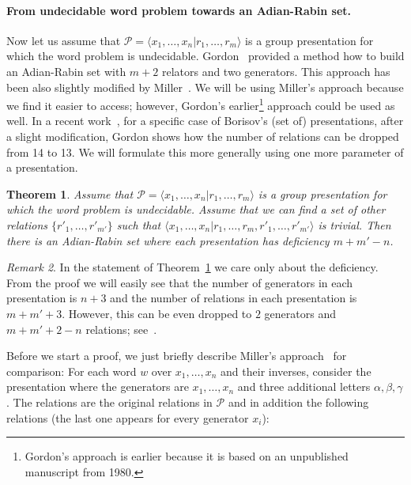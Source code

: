 \documentclass[10pt,a4paper]{article}
\newtheorem{theorem}{Theorem}
\theoremstyle{definition}
\theoremstyle{remark}
\newtheorem{remark}[theorem]{Remark}
\newcommand\PP{\mathcal{P}}
\begin{document}
\paragraph{From undecidable word problem towards an Adian-Rabin set.} Now let us assume that
$\PP = \langle x_1, \dots, x_n|r_1, \dots, r_m\rangle$ is a group presentation
for which the word problem is undecidable. Gordon~\cite{gordon95} provided a
method how to build an Adian-Rabin set with $m+2$ relators and two
generators. This approach has been also slightly modified by
Miller~\cite{miller92}. We will be using Miller's approach because we find it
easier to access; however, Gordon's earlier\footnote{Gordon's approach is
earlier because it is based on an unpublished manuscript from 1980.} approach
could be used as well. In a recent work~\cite{gordon21}, for a specific case of
Borisov's (set of) presentations, after a slight modification, Gordon shows how the number of
relations can be dropped from 14 to 13. We will formulate this more generally
using one more parameter of a presentation.

\begin{theorem}
\label{t:ar_sequence}
Assume that $\PP = \langle x_1, \dots, x_n|r_1, \dots, r_m\rangle$ is a group
  presentation for which the word problem is undecidable. Assume that we can
  find a set of other relations $\{r'_1, \dots, r'_{m'}\}$ such that
  $\langle x_1, \dots, x_n|r_1, \dots, r_m, r'_1, \dots, r'_{m'}\rangle$ is
  trivial. Then there is an Adian-Rabin set where each presentation has
  deficiency $m + m' - n$.
\end{theorem}


\begin{remark}
  In the statement of Theorem~\ref{t:ar_sequence} we care only about the
  deficiency. From the proof we will easily see that the number of
  generators in each presentation is $n+3$ and the number of relations in each
  presentation is $m + m' + 3$. However, this can be even dropped to $2$ generators and
  $m + m' + 2 - n$ relations; see~\cite{miller92,chernavsky-leksine06}.
\end{remark}

Before we start a proof, we just briefly describe Miller's
approach~\cite{miller92} for comparison: For each word $w$ over $x_1, \dots, x_n$ and their
inverses, consider the presentation where the generators are $x_1,
\dots, x_n$ and three additional letters $\alpha, \beta, \gamma$. The relations
are the original relations in $\PP$ and in addition the following relations
(the last one appears for every generator $x_i$):
\end{document}
